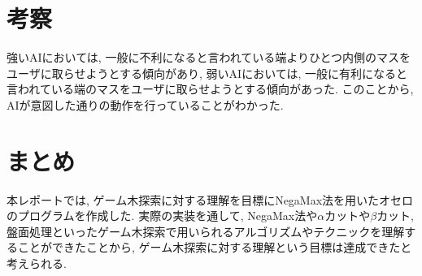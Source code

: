 \documentclass[uplatex,titlepage]{jsarticle}
\begin{document}
\clearpage
\section{考察}
強いAIにおいては, 一般に不利になると言われている端よりひとつ内側のマスをユーザに取らせようとする傾向があり, 弱いAIにおいては, 一般に有利になると言われている端のマスをユーザに取らせようとする傾向があった. このことから, AIが意図した通りの動作を行っていることがわかった.

\section{まとめ}
本レポートでは, ゲーム木探索に対する理解を目標にNegaMax法を用いたオセロのプログラムを作成した. 実際の実装を通して, NegaMax法や$\alpha$カットや$\beta$カット, 盤面処理といったゲーム木探索で用いられるアルゴリズムやテクニックを理解することができたことから, ゲーム木探索に対する理解という目標は達成できたと考えられる.

\appendix


\end{document}
